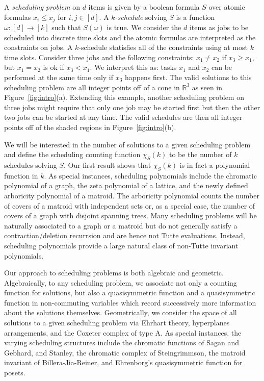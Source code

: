 \documentclass[12pt,reqno]{amsart}
\numberwithin{definition}{section}
\theoremstyle{definition}
\newcommand{\defn}[1]{\emph{#1}}
\newcommand{\poly}{\chi} %
\begin{document}
A \defn{scheduling problem} on $d$ items is given by a boolean
formula $S$ over atomic formulas $x_i\leq x_j$ for
$i,j\in[d]$. A \defn{$k$-schedule} solving $S$ is a function
$\omega:[d]\rightarrow[k]$ such that $S(\omega)$ is true.  We
consider the $d$ items as jobs to be scheduled into discrete time
slots and the atomic formulas are interpreted as the constraints on
jobs.  A $k$-schedule statisfies all of the constraints using at most
$k$ time slots.  Consider three jobs and the following constraints:
$x_1 \neq x_2$ if $ x_3 \geq x_1$, but $x_1 = x_2$ is ok if $x_3 <
x_1$.  We interpret this as: tasks $x_1$ and $x_2$
can be performed at the same time only if $x_3$ happens first.  The valid solutions to this scheduling problem are all integer points off of a cone in $\mathbb{R}^3$ as seen in Figure~\ref{fig:intro}(a).   Extending this example, another scheduling problem on three jobs might require that only one job may be started first but then the other two jobs can be started at any time.  The valid schedules are then all integer points off of the shaded regions in Figure~\ref{fig:intro}(b).

We will be interested in the number of solutions to a given scheduling
problem and define the scheduling counting function $\poly_S(k)$ to be
the number of $k$ schedules solving $S$.  Our first result shows that $\poly_S(k)$
is in fact a polynomial function in $k$.  As special instances, scheduling polynomials include the chromatic
polynomial of a graph, the zeta polynomial of a lattice, and the newly defined
arboricity polynomial of a matroid. The arboricity
polynomial counts the number of covers of a matroid with independent sets
or, as a special case, the number of covers of a graph with disjoint
spanning trees.  Many scheduling problems will be naturally associated to
a graph or a matroid but do not generally satisfy a
contraction/deletion recurrsion and are hence not Tutte evaluations.
Instead, scheduling polynomials provide a large natural class of
non-Tutte invariant polynomials.


Our approach to scheduling problems is both algebraic and geometric.
Algebraically, to any scheduling problem, we associate not only a
counting function for solutions, but also a quasisymmetric function
and a quasisymmetric function in non-commuting variables which record
successively more information about the solutions themselves.
Geometrically, we consider the space of all solutions to a given
scheduling problem via Ehrhart theory, hyperplanes arrangements, and
the Coxeter complex of type A.  As special instances, the varying scheduling structures include the
chromatic functions of Sagan and Gebhard, and Stanley, the chromatic
complex of Steingrimmson, the matroid invariant of Billera-Jia-Reiner,
and Ehrenborg's quasisymmetric function for posets.
\end{document}
